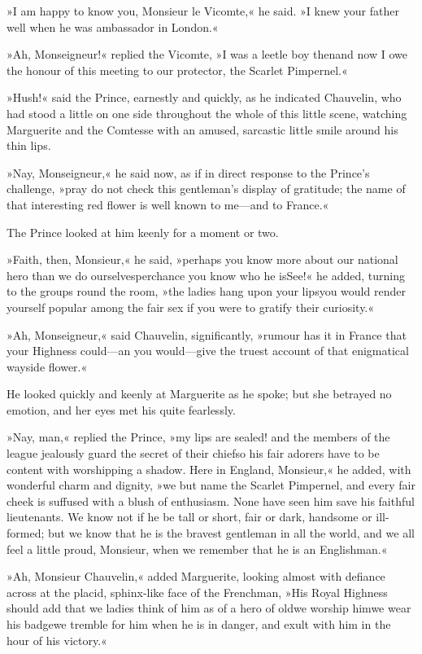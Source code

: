 »I am happy to know you, Monsieur le Vicomte,« he said. »I knew your father well when he was ambassador in London.«

»Ah, Monseigneur!« replied the Vicomte, »I was a leetle boy then\textellipsis \allowbreak  and now I owe the honour of this meeting to our protector, the Scarlet Pimpernel.«

»Hush!« said the Prince, earnestly and quickly, as he indicated Chauvelin, who had stood a little on one side throughout the whole of this little scene, watching Marguerite and the Comtesse with an amused, sarcastic little smile around his thin lips.

»Nay, Monseigneur,« he said now, as if in direct response to the Prince's challenge, »pray do not check this gentleman's display of gratitude; the name of that interesting red flower is well known to me—and to France.«

The Prince looked at him keenly for a moment or two.

»Faith, then, Monsieur,« he said, »perhaps you know more about our national hero than we do ourselves\textellipsis \allowbreak  perchance you know who he is\textellipsis \allowbreak  See!« he added, turning to the groups round the room, »the ladies hang upon your lips\textellipsis \allowbreak  you would render yourself popular among the fair sex if you were to gratify their curiosity.«

»Ah, Monseigneur,« said Chauvelin, significantly, »rumour has it in France that your Highness could—an you would—give the truest account of that enigmatical wayside flower.«

He looked quickly and keenly at Marguerite as he spoke; but she betrayed no emotion, and her eyes met his quite fearlessly.

»Nay, man,« replied the Prince, »my lips are sealed! and the members of the league jealously guard the secret of their chief\textellipsis \allowbreak  so his fair adorers have to be content with worshipping a shadow. Here in England, Monsieur,« he added, with wonderful charm and dignity, »we but name the Scarlet Pimpernel, and every fair cheek is suffused with a blush of enthusiasm. None have seen him save his faithful lieutenants. We know not if he be tall or short, fair or dark, handsome or ill-formed; but we know that he is the bravest gentleman in all the world, and we all feel a little proud, Monsieur, when we remember that he is an Englishman.«

»Ah, Monsieur Chauvelin,« added Marguerite, looking almost with defiance across at the placid, sphinx-like face of the Frenchman, »His Royal Highness should add that we ladies think of him as of a hero of old\textellipsis \allowbreak  we worship him\textellipsis \allowbreak  we wear his badge\textellipsis \allowbreak  we tremble for him when he is in danger, and exult with him in the hour of his victory.«

